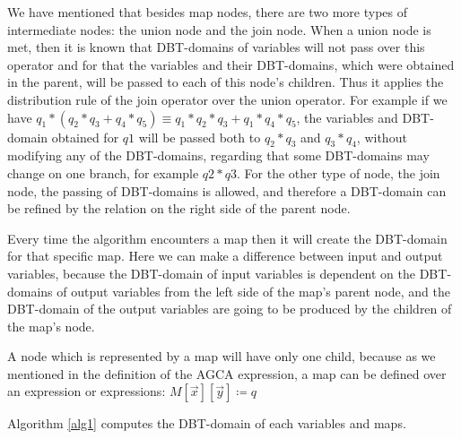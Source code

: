\documentclass[12pt]{article}
\begin{document}
We have mentioned that besides map nodes, there are two more types of intermediate nodes: the union node and the join node. When a union node is met, then it is known that DBT-domains of variables will not pass over this operator and for that the variables and their DBT-domains, which were obtained in the parent, will be passed to each of this node's children. Thus it applies the distribution rule of the join operator over the union operator. For example if we have $ q_{1} * (q_{2} * q_{3} + q_{4} * q_{5}) \equiv q_{1} * q_{2} * q_{3} + q_{1} * q_{4} * q_{5}$, the variables and DBT-domain obtained for $q1$ will be passed both to $q_{2}*q_{3}$ and $q_{3}*q_{4}$, without modifying any of the DBT-domains, regarding that some DBT-domains may change on one branch, for example $q2*q3$. For the other type of node, the join node, the passing of DBT-domains is allowed, and therefore a DBT-domain can be refined by the relation on the right side of the parent node.
	
Every time the algorithm encounters a map then it will create the DBT-domain for that specific map. Here we can make a difference between input and output variables, because the DBT-domain of input variables is dependent on the DBT-domains of output variables from the left side of the map's parent node, and the DBT-domain of the output variables are going to be produced by the children of the map's node. %

A node which is represented by a map will have only one child, because as we mentioned in the definition of the AGCA expression, a map can be defined over an expression or expressions: $M[\vec{x}][\vec{y}]\coloneqq q$
\begin{theorem}
Algorithm \ref{alg1} computes the DBT-domain of each variables and maps.
\end{theorem}
\end{document}
